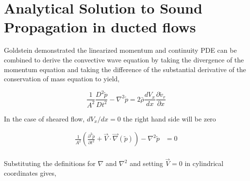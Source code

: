 %
%
%
\section{Analytical Solution to Sound Propagation in ducted flows}

Goldstein demonstrated the linearized momentum and continuity PDE  can be 
combined to derive the convective wave equation by taking the divergence of
the momentum equation and taking the difference of the substantial derivative
of the conservation of mass equation to yield,

\begin{equation}
    \frac{1}{A^2}\frac{D^2\tilde{p}}{Dt^2} -
    \nabla^2 \tilde{p} =
    2 \bar{\rho} \frac{d V_x}{d x} \frac{\partial  \tilde{v}_r}{ \partial x} 
    \label{eqn:KousensWaveEquation}
\end{equation}


In the case of sheared flow, $dV_x/dx = 0$ the right hand side will be zero 



\begin{align*}
    \frac{1}{A^2}\left(
        \frac{\partial^2 \tilde{p}}{\partial t^2} + 
        \vec{V}\cdot \vec {\nabla} (\tilde{p}) 
    \right) -
    \nabla^2
    \tilde{p} &=
    0 \\
\end{align*}

Substituting the definitions for $\nabla$ and $\nabla^2$ and setting $\vec{V} =0$
in cylindrical coordinates gives,


